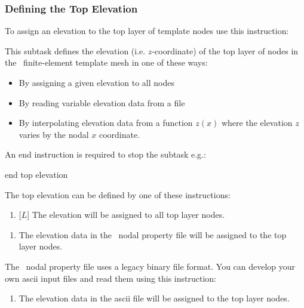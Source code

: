 \subsubsection{Defining the Top Elevation} \label{section:topelev}
To assign an elevation to the top layer of template nodes use this instruction:

    {This subtask defines the elevation (i.e. $z$-coordinate) of the top layer of nodes in the \gwf\ finite-element template mesh in one of these ways:
     \begin{itemize}
        \item By assigning a given elevation to all nodes
        \item By reading variable elevation data from a file
        \item By interpolating elevation data from a function $z(x)$ where the elevation $z$ varies by the nodal $x$ coordinate.
     \end{itemize}

    An end instruction is required to stop the subtask e.g.:

    {\Large \sf end top elevation}
    }

 The top elevation can be defined by one of these instructions: \label{'Page:TopElev'}

    {\squish
    \begin{enumerate}
    \item {} [$L$]  The elevation  will be assigned to all top layer nodes.
    \end{enumerate}
    \squish
    }

    {\squish
    \begin{enumerate}
    \item {}  The elevation data in the \gb\ nodal property file  will be assigned to the top layer nodes.
    \end{enumerate}
    \squish
    }

The \gb\ nodal property file uses a legacy binary file format. You can develop your own ascii input files and read them using this instruction:

    {\squish
    \begin{enumerate}
    \item {}  The elevation data in the ascii file  will be assigned to the top layer nodes.
    \end{enumerate}
    \squish
    }

